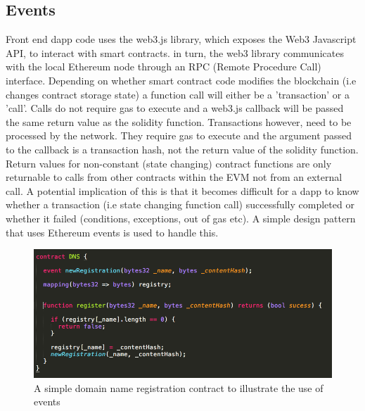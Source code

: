 \subsection{Events}
\label{subsec:events}
Front end dapp code uses the web3.js library\cite{Web3JS}, which exposes the Web3 Javascript API\cite{JavascriptAPI}, to interact with smart contracts. in turn, the web3 library communicates with the local Ethereum node through an RPC (Remote Procedure Call) interface. Depending on whether smart contract code modifies the blockchain (i.e changes contract storage state) a function call will either be a 'transaction' or a 'call'. Calls do not require gas to execute and a web3.js callback will be passed the same return value as the solidity function. Transactions however, need to be processed by the network. They require gas to execute and the argument passed to the callback is a transaction hash, not the return value of the solidity function. Return values for non-constant (state changing) contract functions are only returnable to calls from other contracts within the EVM not from an external call. A potential implication of this is that it becomes difficult for a dapp to know whether a transaction (i.e state changing function call) successfully completed or whether it failed (conditions, exceptions, out of gas etc). A simple design pattern that uses Ethereum events is used to handle this. \\
\begin{figure}
\centering
\includegraphics[width=\textwidth]{Figures/DNSContract}
\decoRule
\caption[]{A simple domain name registration contract to illustrate the use of events}
\label{fig:DNSContract}
\end{figure}


